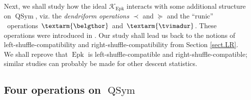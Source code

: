 \documentclass[numbers=enddot,12pt,final,onecolumn,notitlepage]{scrartcl}%
\theoremstyle{definition}
\newenvironment{verlong}{}{}
\newcommand{\tvi}{\left. \textarm{\tvimadur} \right.}
\newcommand{\bel}{\left. \textarm{\belgthor} \right.}
\begin{document}
\begin{verlong}
Next, we shall study how the ideal $\mathcal{K}_{\operatorname{Epk}}$
interacts with some additional structure on $\operatorname*{QSym}$, viz. the
\textit{dendriform operations }$\left.  \prec\right.  $ and $\left.
\succeq\right.  $ and the \textquotedblleft runic\textquotedblright%
\ operations $\bel$ and $\tvi$. These operations were introduced in
\cite{dimcr}. Our study shall lead us back to the notions of
left-shuffle-compatibility and right-shuffle-compatibility from Section
\ref{sect.LR}. We shall reprove that $\operatorname{Epk}$ is
left-shuffle-compatible and right-shuffle-compatible; similar studies can
probably be made for other descent statistics.

\subsection{Four operations on $\operatorname*{QSym}$}


\end{verlong}
\end{document}
